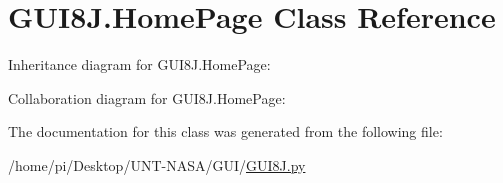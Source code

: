 \hypertarget{classGUI8J_1_1HomePage}{}\section{G\+U\+I8\+J.\+Home\+Page Class Reference}
\label{classGUI8J_1_1HomePage}


Inheritance diagram for G\+U\+I8\+J.\+Home\+Page\+:


Collaboration diagram for G\+U\+I8\+J.\+Home\+Page\+:


The documentation for this class was generated from the following file\+:\begin{DoxyCompactItemize}
\item 
/home/pi/\+Desktop/\+U\+N\+T-\/\+N\+A\+S\+A/\+G\+U\+I/\hyperlink{GUI8J_8py}{G\+U\+I8\+J.\+py}\end{DoxyCompactItemize}
